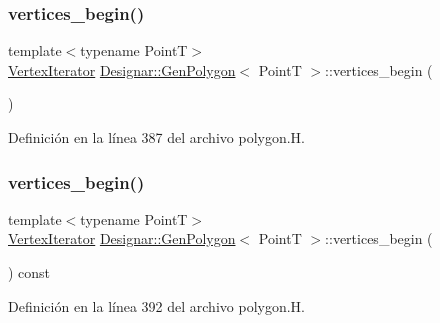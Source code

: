 \subsubsection{\texorpdfstring{vertices\+\_\+begin()}{vertices\_begin()}\hspace{0.1cm}{\footnotesize\ttfamily [1/2]}}
{\footnotesize\ttfamily template$<$typename PointT$>$ \\
\hyperlink{class_designar_1_1_gen_polygon_1_1_vertex_iterator}{Vertex\+Iterator} \hyperlink{class_designar_1_1_gen_polygon}{Designar\+::\+Gen\+Polygon}$<$ PointT $>$\+::vertices\+\_\+begin (\begin{DoxyParamCaption}{ }\end{DoxyParamCaption})\hspace{0.3cm}{\ttfamily [inline]}}



Definición en la línea 387 del archivo polygon.\+H.

\mbox{\label{class_designar_1_1_gen_polygon_a1a2dd20f7312fcba7649263f77e9f649}} 
\subsubsection{\texorpdfstring{vertices\+\_\+begin()}{vertices\_begin()}\hspace{0.1cm}{\footnotesize\ttfamily [2/2]}}
{\footnotesize\ttfamily template$<$typename PointT$>$ \\
\hyperlink{class_designar_1_1_gen_polygon_1_1_vertex_iterator}{Vertex\+Iterator} \hyperlink{class_designar_1_1_gen_polygon}{Designar\+::\+Gen\+Polygon}$<$ PointT $>$\+::vertices\+\_\+begin (\begin{DoxyParamCaption}{ }\end{DoxyParamCaption}) const\hspace{0.3cm}{\ttfamily [inline]}}



Definición en la línea 392 del archivo polygon.\+H.

\mbox{\label{class_designar_1_1_gen_polygon_aad1c6e27b6288072e2821c65512ba2a4}} 
